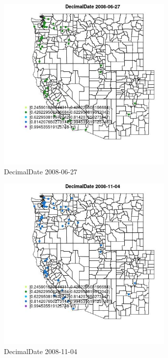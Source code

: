 \begin{figure} 
\centering  
\includegraphics[width=0.77\textwidth]{Code_Outputs/Report_ML_input_PM25_Step4_part_e_de_duplicated_aves_MapObsDecimalDate2008-06-27.jpg} 
\caption{\label{fig:Report_ML_input_PM25_Step4_part_e_de_duplicated_avesMapObsDecimalDate2008-06-27}DecimalDate 2008-06-27} 
\end{figure} 
 

\begin{figure} 
\centering  
\includegraphics[width=0.77\textwidth]{Code_Outputs/Report_ML_input_PM25_Step4_part_e_de_duplicated_aves_MapObsDecimalDate2008-11-04.jpg} 
\caption{\label{fig:Report_ML_input_PM25_Step4_part_e_de_duplicated_avesMapObsDecimalDate2008-11-04}DecimalDate 2008-11-04} 
\end{figure} 
 

